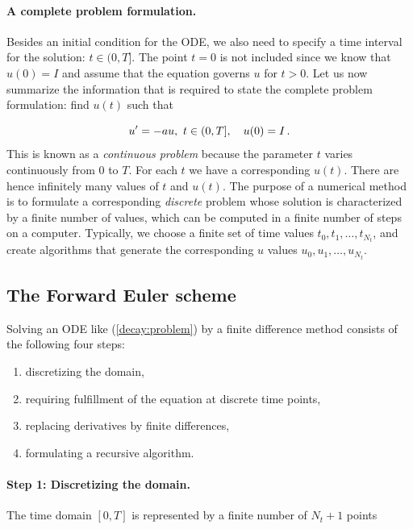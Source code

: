 \documentclass[%
oneside,                 %
final,                   %
10pt]{article}
\begin{document}
\paragraph{A complete problem formulation.}
Besides an initial condition for the ODE, we also need to specify a
time interval for the solution: $t\in (0,T]$.
The point $t=0$ is not
included since we know that $u(0)=I$ and assume that the equation governs
$u$ for $t>0$.
Let us now summarize the information that is required to
state the complete problem formulation:
find $u(t)$
such that

\begin{equation}
u^{\prime} = -au,\ t\in (0,T], \quad u(0)=I\thinspace .   \label{decay:problem}
\end{equation}
This is known as a \emph{continuous problem} because the parameter $t$
varies continuously from $0$ to $T$. For each $t$ we have a corresponding
$u(t)$. There are hence infinitely many values of $t$ and $u(t)$.
The purpose of a numerical method is to formulate a corresponding
\emph{discrete} problem whose solution is characterized by a finite number of values,
which can be computed in a finite number of steps on a computer.
Typically, we choose a finite set of time values $t_0,t_1,\ldots,t_{N_t}$,
and create algorithms that generate the corresponding $u$ values
$u_0,u_1,\ldots,u_{N_t}$.


\subsection{The Forward Euler scheme}
\label{decay:schemes:FE}

Solving an ODE like (\ref{decay:problem}) by a finite difference method
consists of the following four steps:

\begin{enumerate}
\item discretizing the domain,

\item requiring fulfillment of the equation at discrete time points,

\item replacing derivatives by finite differences,

\item formulating a recursive algorithm.
\end{enumerate}

\noindent
{} 

\paragraph{Step 1: Discretizing the domain.}
The time domain $[0,T]$ is represented by a finite number of
$N_t+1$ points
\end{document}

